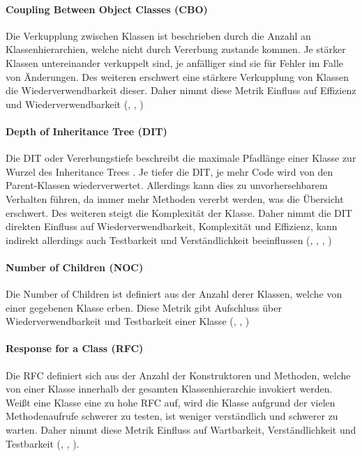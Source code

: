 \documentclass[a4paper, 12pt]{article}
\begin{document}
\paragraph{Coupling Between Object Classes (CBO)}
Die Verkupplung zwischen Klassen ist beschrieben durch die Anzahl an Klassenhierarchien, welche nicht durch Vererbung zustande kommen.
Je stärker Klassen untereinander verkuppelt sind, je anfälliger sind sie für Fehler im Falle von Änderungen.
Des weiteren erschwert eine stärkere Verkupplung von Klassen die Wiederverwendbarkeit dieser.
Daher nimmt diese Metrik Einfluss auf Effizienz und Wiederverwendbarkeit (\textcite{Metrics_OO_design}, \textcite{Linda_softwarequality}, \textcite{Lorenz_object_oriented_software_metrics})

\paragraph{Depth of Inheritance Tree (DIT)}
Die DIT oder Vererbungstiefe beschreibt die maximale Pfadlänge einer Klasse zur Wurzel des Inheritance Trees \parencite{Metrics_OO_design}.
Je tiefer die DIT, je mehr Code wird von den Parent-Klassen wiederverwertet.
Allerdings kann dies zu unvorhersehbarem Verhalten führen, da immer mehr Methoden vererbt werden, was die Übersicht erschwert.
Des weiteren steigt die Komplexität der Klasse.
Daher nimmt die DIT direkten Einfluss auf Wiederverwendbarkeit, Komplexität und Effizienz, kann indirekt allerdings auch Testbarkeit und Verständlichkeit beeinflussen (\textcite{Metrics_OO_design}, \textcite{Linda_softwarequality}, \textcite{Lorenz_object_oriented_software_metrics}, \textcite{Code_metrics_dit_microsoft})

\paragraph{Number of Children (NOC)}
Die Number of Children ist definiert aus der Anzahl derer Klassen, welche von einer gegebenen Klasse erben. Diese Metrik gibt Aufschluss über Wiederverwendbarkeit und Testbarkeit einer Klasse (\textcite{Metrics_OO_design}, \textcite{Linda_softwarequality}, \textcite{ukessays_2018})

\paragraph{Response for a Class (RFC)}
Die RFC definiert sich aus der Anzahl der Konstruktoren und Methoden, welche von einer Klasse innerhalb der gesamten Klassenhierarchie invokiert werden.
Weißt eine Klasse eine zu hohe RFC auf, wird die Klasse aufgrund der vielen Methodenaufrufe schwerer zu testen, ist weniger verständlich und schwerer zu warten.
Daher nimmt diese Metrik Einfluss auf Wartbarkeit, Verständlichkeit und Testbarkeit (\textcite{Metrics_OO_design}, \textcite{Linda_softwarequality}, \textcite{ukessays_2018}).
\end{document}
